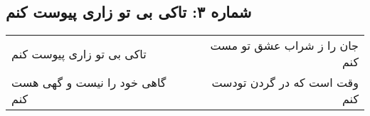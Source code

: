 \begin{center}
\section*{شماره ۳: تاکی بی تو زاری پیوست کنم}
\label{sec:003}
\begin{longtable}{l p{0.5cm} r}
تاکی بی تو زاری پیوست کنم
&&
جان را ز شراب عشق تو مست کنم
\\
گاهی خود را نیست و گهی هست کنم
&&
وقت است که در گردن تودست کنم
\\
\end{longtable}
\end{center}
